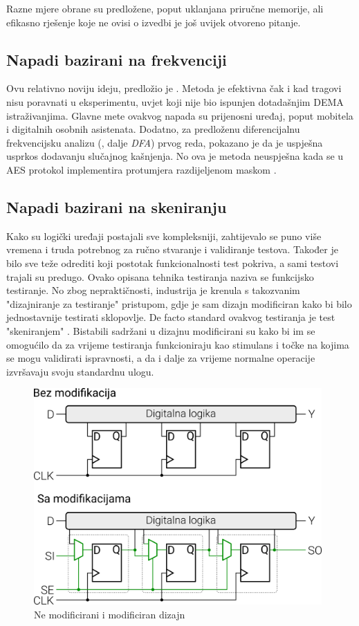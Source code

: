\documentclass[times, utf8, diplomski]{fer}
\begin{document}
Razne mjere obrane su predložene, poput uklanjana priručne memorije, ali efikasno rješenje koje ne ovisi o izvedbi je još uvijek otvoreno pitanje.

\subsection{Napadi bazirani na frekvenciji}

Ovu relativno noviju ideju, predložio je \cite{tiu2005new}. Metoda je efektivna čak i kad tragovi nisu poravnati u eksperimentu, uvjet koji nije bio ispunjen dotadašnjim DEMA istraživanjima. Glavne mete ovakvog napada su prijenosni uređaj, poput mobitela i digitalnih osobnih asistenata. Dodatno, za predloženu diferencijalnu frekvencijsku analizu (, dalje \emph{DFA}) prvog reda, pokazano je da je uspješna usprkos dodavanju slučajnog kašnjenja. No ova je metoda neuspješna kada se u AES protokol implementira protumjera razdijeljenom maskom .

\subsection{Napadi bazirani na skeniranju}

Kako su logički uređaji postajali sve kompleksniji, zahtijevalo se puno više vremena i truda potrebnog za ručno stvaranje i validiranje testova. Također je bilo sve teže odrediti koji postotak funkcionalnosti test pokriva, a sami testovi trajali su predugo. Ovako opisana tehnika testiranja naziva se funkcijsko testiranje. No zbog nepraktičnosti, industrija je krenula s takozvanim "dizajniranje za testiranje"  pristupom, gdje je sam dizajn modificiran kako bi bilo jednostavnije testirati sklopovlje. De facto standard ovakvog testiranja je test "skeniranjem" . Bistabili sadržani u dizajnu modificirani su kako bi im se omogućilo da za vrijeme testiranja funkcioniraju kao stimulans i točke na kojima se mogu validirati ispravnosti, a da i dalje za vrijeme normalne operacije izvršavaju svoju standardnu ulogu.

\begin{figure}[htb]
    \centering
    \includegraphics[width=11cm]{resources/images/SCA/scan-test.png}
    \caption{Ne modificirani i modificiran dizajn}
    \label{fig:scan-test}
\end{figure}
\end{document}
